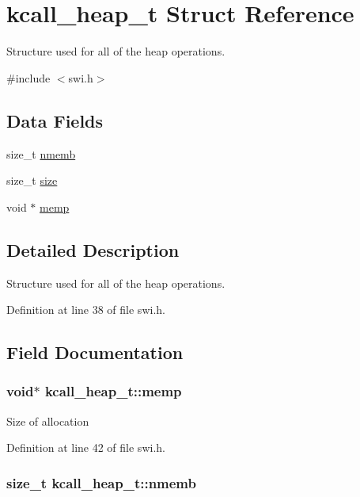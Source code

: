 \hypertarget{structkcall__heap__t}{\section{kcall\-\_\-heap\-\_\-t Struct Reference}
\label{structkcall__heap__t}
}


Structure used for all of the heap operations.  




{\ttfamily \#include $<$swi.\-h$>$}

\subsection*{Data Fields}
\begin{DoxyCompactItemize}
\item 
size\-\_\-t \hyperlink{structkcall__heap__t_aecdaec673b11d3f88ef1d36b4f0c0f44}{nmemb}
\item 
size\-\_\-t \hyperlink{structkcall__heap__t_a4ace4b9692bb1da087cd484c5331fb67}{size}
\item 
void $\ast$ \hyperlink{structkcall__heap__t_a39322509c6e8532f8ac513aa2d4e4b67}{memp}
\end{DoxyCompactItemize}


\subsection{Detailed Description}
Structure used for all of the heap operations. 

Definition at line 38 of file swi.\-h.



\subsection{Field Documentation}
\hypertarget{structkcall__heap__t_a39322509c6e8532f8ac513aa2d4e4b67}{
\subsubsection[{memp}]{\setlength{\rightskip}{0pt plus 5cm}void$\ast$ kcall\-\_\-heap\-\_\-t\-::memp}}\label{structkcall__heap__t_a39322509c6e8532f8ac513aa2d4e4b67}
Size of allocation 

Definition at line 42 of file swi.\-h.

\hypertarget{structkcall__heap__t_aecdaec673b11d3f88ef1d36b4f0c0f44}{
\subsubsection[{nmemb}]{\setlength{\rightskip}{0pt plus 5cm}size\-\_\-t kcall\-\_\-heap\-\_\-t\-::nmemb}}\label{structkcall__heap__t_aecdaec673b11d3f88ef1d36b4f0c0f44}


